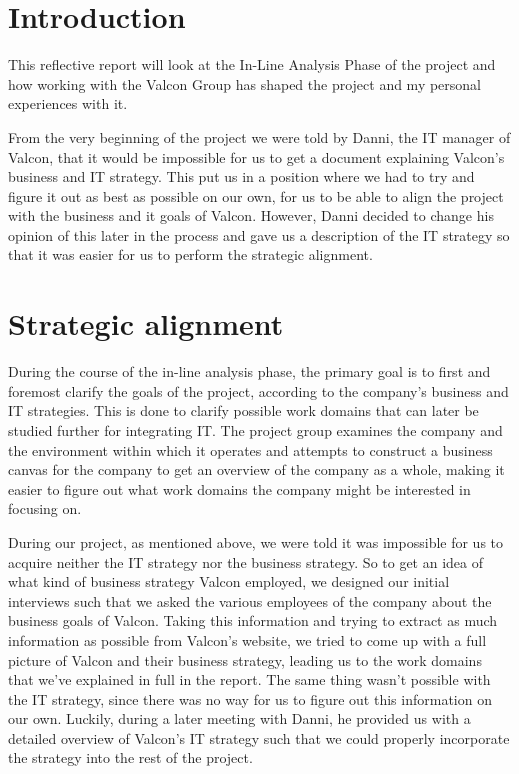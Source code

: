 \section{Introduction}
This reflective report will look at the In-Line Analysis Phase of the project and how working with the Valcon Group has shaped the project and my personal experiences with it.

From the very beginning of the project we were told by Danni, the IT manager of Valcon, that it would be impossible for us to get a document explaining Valcon’s business and IT strategy. This put us in a position where we had to try and figure it out as best as possible on our own, for us to be able to align the project with the business and it goals of Valcon.
However, Danni decided to change his opinion of this later in the process and gave us a description of the IT strategy so that it was easier for us to perform the strategic alignment.

\section{Strategic alignment}
During the course of the in-line analysis phase, the primary goal  is to first and foremost clarify the goals of the project, according to the company’s business and IT strategies. This is done to clarify possible work domains that can later be studied further for integrating IT. The project group examines the company and the environment within which it operates and attempts to construct a business canvas for the company to get an overview of the company as a whole, making it easier to figure out what work domains the company might be interested in focusing on.

During our project, as mentioned above, we were told it was impossible for us to acquire neither the IT strategy nor the business strategy. So to get an idea of what kind of business strategy Valcon employed, we designed our initial interviews such that we asked the various employees of the company about the business goals of Valcon. Taking this information and trying to extract as much information as possible from Valcon’s website, we tried to come up with a full picture of Valcon and their business strategy, leading us to the work domains that we’ve explained in full in the report.
The same thing wasn’t possible with the IT strategy, since there was no way for us to figure out this information on our own. Luckily, during a later meeting with Danni, he provided us with a detailed overview of Valcon’s IT strategy such that we could properly incorporate the strategy into the rest of the project.

